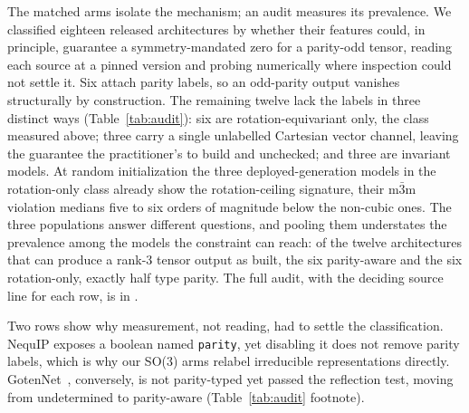 The matched arms isolate the mechanism; an audit measures its prevalence. We classified eighteen released architectures by whether their features could, in principle, guarantee a symmetry-mandated zero for a parity-odd tensor, reading each source at a pinned version and probing numerically where inspection could not settle it. Six attach parity labels, so an odd-parity output vanishes structurally by construction. The remaining twelve lack the labels in three distinct ways (Table~\ref{tab:audit}): six are rotation-equivariant only, the class measured above; three carry a single unlabelled Cartesian vector channel, leaving the guarantee the practitioner's to build and unchecked; and three are invariant models. At random initialization the three deployed-generation models in the rotation-only class already show the rotation-ceiling signature, their m$\bar 3$m violation medians five to six orders of magnitude below the non-cubic ones. The three populations answer different questions, and pooling them understates the prevalence among the models the constraint can reach: of the twelve architectures that can produce a rank-3 tensor output as built, the six parity-aware and the six rotation-only, exactly half type parity. The full audit, with the deciding source line for each row, is in .

Two rows show why measurement, not reading, had to settle the classification. NequIP exposes a boolean named \texttt{parity}, yet disabling it does not remove parity labels, which is why our SO(3) arms relabel irreducible representations directly. GotenNet~\cite{aykent2025gotennet}, conversely, is not parity-typed yet passed the reflection test, moving from undetermined to parity-aware (Table~\ref{tab:audit} footnote).

